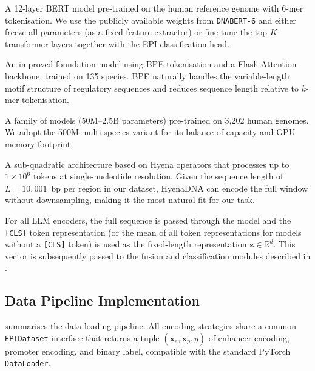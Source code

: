 \begin{description}[noitemsep]
  \item[DNABERT~\cite{dnabert}]
    A 12-layer BERT model pre-trained on the human reference genome
    with 6-mer tokenisation. We use the publicly available weights from
    \texttt{DNABERT-6} and either freeze all parameters (as a fixed feature extractor)
    or fine-tune the top $K$ transformer layers together with the EPI classification head.

  \item[DNABERT-2~\cite{dnabert2}]
    An improved foundation model using BPE tokenisation and a Flash-Attention backbone,
    trained on 135 species. BPE naturally handles the variable-length motif structure
    of regulatory sequences and reduces sequence length relative to $k$-mer tokenisation.

  \item[Nucleotide Transformer~\cite{nucleotide_transformer}]
    A family of models (50M--2.5B parameters) pre-trained on 3,202 human genomes.
    We adopt the 500M multi-species variant for its balance of capacity and GPU memory
    footprint.

  \item[HyenaDNA~\cite{hyenadna}]
    A sub-quadratic architecture based on Hyena operators that processes up to
    $1 \times 10^6$ tokens at single-nucleotide resolution.
    Given the sequence length of $L = 10{,}001$~bp per region in our dataset,
    HyenaDNA can encode the full window without downsampling, making it the
    most natural fit for our task.
\end{description}

For all LLM encoders, the full sequence is passed through the model and the
\texttt{[CLS]} token representation (or the mean of all token representations
for models without a \texttt{[CLS]} token) is used as the fixed-length
representation $\mathbf{z} \in \mathbb{R}^{d}$.
This vector is subsequently passed to the fusion and classification modules
described in .

\subsection{Data Pipeline Implementation}

 summarises the data loading pipeline.
All encoding strategies share a common \texttt{EPIDataset} interface that returns
a tuple $(\mathbf{x}_e, \mathbf{x}_p, y)$ of enhancer encoding, promoter encoding,
and binary label, compatible with the standard PyTorch \texttt{DataLoader}.

